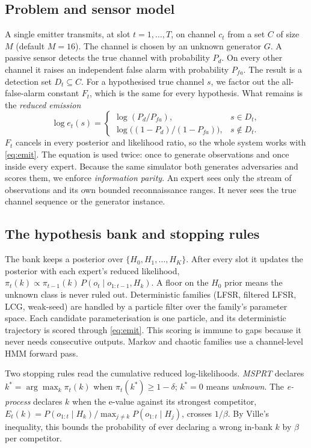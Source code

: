 \documentclass[conference]{IEEEtran}
\begin{document}
\subsection{Problem and sensor model}
A single emitter transmits, at slot $t=1,\dots,T$, on channel $c_t$ from a set
$C$ of size $M$ (default $M=16$). The channel is chosen by an unknown generator
$G$. A passive sensor detects the true channel with probability $P_d$. On every
other channel it raises an independent false alarm with probability $P_{fa}$.
The result is a detection set $D_t\subseteq C$. For a hypothesised true channel
$s$, we factor out the all-false-alarm constant $F_t$, which is the same for
every hypothesis. What remains is the \emph{reduced emission}
\begin{equation}
\log e_t(s)=
\begin{cases}
\log(P_d/P_{fa}), & s\in D_t,\\[2pt]
\log\!\big((1-P_d)/(1-P_{fa})\big), & s\notin D_t.
\end{cases}
\label{eq:emit}
\end{equation}
$F_t$ cancels in every posterior and likelihood ratio, so the whole system
works with \eqref{eq:emit}. The equation is used twice: once to generate
observations and once inside every expert. Because the same simulator both
generates adversaries and scores them, we enforce \emph{information parity}. An
expert sees only the stream of observations and its own bounded reconnaissance
ranges. It never sees the true channel sequence or the generator instance.

\subsection{The hypothesis bank and stopping rules}
\label{sec:bank}
The bank keeps a posterior over $\{H_0,H_1,\dots,H_K\}$. After every slot it
updates the posterior with each expert's reduced likelihood,
$\pi_t(k)\propto\pi_{t-1}(k)\,P(o_t\mid o_{1:t-1},H_k)$. A floor on the $H_0$
prior means the unknown class is never ruled out. Deterministic families
(LFSR, filtered LFSR, LCG, weak-seed) are handled by a particle filter over
the family's parameter space. Each candidate parameterisation is one particle,
and its deterministic trajectory is scored through \eqref{eq:emit}. This
scoring is immune to gaps because it never needs consecutive outputs. Markov
and chaotic families use a channel-level HMM forward pass.

Two stopping rules read the cumulative reduced log-likelihoods. \emph{MSPRT}
declares $k^\ast=\arg\max_k\pi_t(k)$ when $\pi_t(k^\ast)\geq1-\delta$;
$k^\ast=0$ means \emph{unknown}. The \emph{e-process} declares $k$ when the
e-value against its strongest competitor,
$E_t(k)=P(o_{1:t}\mid H_k)/\max_{j\neq k}P(o_{1:t}\mid H_j)$, crosses $1/\beta$.
By Ville's inequality, this bounds the probability of ever declaring a wrong
in-bank $k$ by $\beta$ per competitor.
\end{document}
